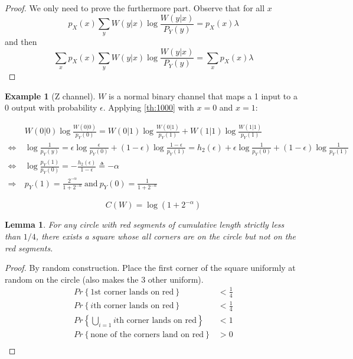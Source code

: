 \documentclass[twoside]{article}
\newtheorem{lemma}[theorem]{Lemma}
\theoremstyle{definition} %
\newtheorem{example}{Example}
\renewcommand{\Pr}[1]{Pr\left\{#1\right\}}
\begin{document}
\begin{proof}
  We only need to prove the furthermore part. Observe that for all $x$
  \[
    p_X(x) \sum_y W(y|x) \log \frac {W(y|x)} {P_Y(y)} =  p_X(x) \lambda
  \]
  and then
  \[
    \sum_x p_X(x) \sum_y W(y|x) \log \frac {W(y|x)} {P_Y(y)} =  \sum_x p_X(x) \lambda
  \]
\end{proof}

\begin{example}[Z channel]
  $W$ is a normal binary channel that maps a 1 input to a 0 output with probability $\epsilon$. Applying \cref{th:1000} with $x=0$ and $x=1$:

  \begin{align*}
    &W(0|0)\log \frac {W(0|0)} {p_Y(0)} = W(0|1)\log \frac {W(0|1)} {p_Y(1)} + W(1|1)\log \frac {W(1|1)} {p_Y(1)}\\
    \iff& \log \frac 1 {p_Y(y)} = \epsilon \log \frac \epsilon {p_Y(0)} + (1-\epsilon) \log \frac {1-\epsilon} {p_Y(1)} = h_2(\epsilon) + \epsilon \log \frac 1 {p_Y(0)} + (1-\epsilon)\log\frac 1 {p_Y(1)}\\
    \iff&\log \frac {p_Y(1)} {p_Y(0)} = - \frac {h_2(\epsilon)}{1-\epsilon} \triangleq -\alpha\\
    \Longrightarrow~&p_Y(1) = \frac {2^{-\alpha}} { 1+2^{-\alpha}} ~\text{and}~p_Y(0) = \frac 1 {1+2^{-\alpha}}
  \end{align*}

  \[
    C(W) = \log (1+2^{-\alpha})
  \]
\end{example}


\begin{lemma}
  For any circle with red segments of cumulative length strictly less than $1/4$, there exists a square whose all corners are on the circle but not on the red segments.
\end{lemma}

\begin{proof}
  By random construction. Place the first corner of the square uniformly at random on the circle (also makes the 3 other uniform).
  \begin{align*}
    \Pr{\text{1st corner lands on red}} &< \frac 1 4\\
    \Pr{i\text{th corner lands on red}} &< \frac 1 4\\
    \Pr{\bigcup\limits_{i=1} i\text{th corner lands on red}} &< 1\\
    \Pr{\text{none of the corners land on red}} &> 0\\
  \end{align*}
\end{proof}
\end{document}
